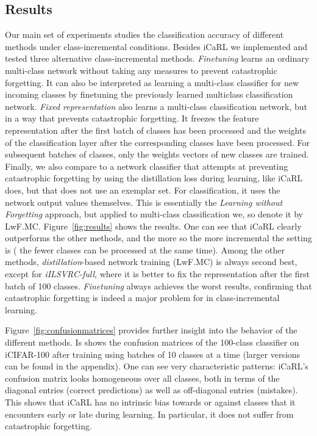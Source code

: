 \documentclass[10pt,twocolumn,letterpaper]{article}
\begin{document}
\subsection{Results}\label{subsec:results}
Our main set of experiments studies the classification 
accuracy of different methods under class-incremental 
conditions. Besides iCaRL we implemented and tested 
three alternative class-incremental methods. \emph{Finetuning} learns 
an ordinary multi-class network without taking any measures to 
prevent catastrophic forgetting. It can also be interpreted as 
learning a multi-class classifier for new incoming classes by 
finetuning the previously learned multiclass classification network. 
\emph{Fixed representation} also learns a multi-class classification 
network, but in a way that prevents catastrophic forgetting. It freezes 
the feature representation after the first batch of classes has been 
processed and the weights of the classification layer after the 
corresponding classes have been processed. 
For subsequent batches of classes, only the weights vectors of 
new classes are trained. 
Finally, we also compare to a network classifier that attempts at 
preventing catastrophic forgetting by using the distillation loss 
during learning, like iCaRL does, but that does not use an exemplar 
set. 
For classification, it uses the network output values themselves. 
This is essentially the \emph{Learning without Forgetting} approach,
but applied to multi-class classification we, so denote it by LwF.MC.
Figure~\ref{fig:results} shows the results.
One can see that iCaRL clearly outperforms the other methods, 
and the more so the more incremental the setting is (\ie 
the fewer classes can be processed at the same time). 
Among the other methods, \emph{distillation}-based network training 
(LwF.MC) is always second best, except for \emph{iILSVRC-full},
where it is better to fix the representation after the first 
batch of 100 classes. 
\emph{Finetuning} always achieves the worst results, confirming 
that catastrophic forgetting is indeed a major problem for in 
class-incremental learning. 

Figure~\ref{fig:confusionmatrices} provides further insight into 
the behavior of the different methods. Is shows the confusion 
matrices of the 100-class classifier on iCIFAR-100 
after training using batches of 10 classes at a time (larger versions 
can be found in the appendix). 
One can see very characteristic patterns: iCaRL's confusion matrix 
looks homogeneous over all classes, both in terms of the diagonal 
entries (\ie correct predictions) as well as off-diagonal entries 
(\ie mistakes). 
This shows that iCaRL has no intrinsic bias towards or against 
classes that it encounters early or late during learning. In 
particular, it does not suffer from catastrophic forgetting.
\end{document}
